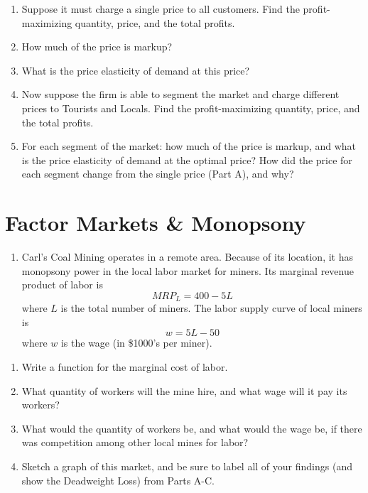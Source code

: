\documentclass[]{article}
\providecommand{\tightlist}{%
  \setlength{\itemsep}{0pt}\setlength{\parskip}{0pt}}
\begin{document}
\begin{enumerate}
\def\labelenumi{\alph{enumi}.}
\tightlist
\item
  Suppose it must charge a single price to all customers. Find the
  profit-maximizing quantity, price, and the total profits.
\item
  How much of the price is markup?
\item
  What is the price elasticity of demand at this price?
\item
  Now suppose the firm is able to segment the market and charge
  different prices to Tourists and Locals. Find the profit-maximizing
  quantity, price, and the total profits.
\item
  For each segment of the market: how much of the price is markup, and
  what is the price elasticity of demand at the optimal price? How did
  the price for each segment change from the single price (Part A), and
  why?
\end{enumerate}

\clearpage

\hypertarget{factor-markets-monopsony}{%
\section{Factor Markets \& Monopsony}\label{factor-markets-monopsony}}

\begin{enumerate}
\def\labelenumi{\arabic{enumi}.}
\setcounter{enumi}{7}
\tightlist
\item
  Carl's Coal Mining operates in a remote area. Because of its location,
  it has monopsony power in the local labor market for miners. Its
  marginal revenue product of labor is \[MRP_L = 400-5L\] where \(L\) is
  the total number of miners. The labor supply curve of local miners is
  \[w = 5L-50\] where \(w\) is the wage (in \$1000's per miner).
\end{enumerate}

\begin{enumerate}
\def\labelenumi{\alph{enumi}.}
\tightlist
\item
  Write a function for the marginal cost of labor.
\item
  What quantity of workers will the mine hire, and what wage will it pay
  its workers?
\item
  What would the quantity of workers be, and what would the wage be, if
  there was competition among other local mines for labor?
\item
  Sketch a graph of this market, and be sure to label all of your
  findings (and show the Deadweight Loss) from Parts A-C.
\end{enumerate}
\end{document}
